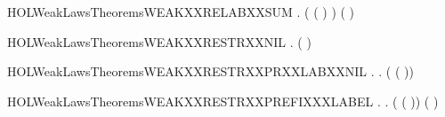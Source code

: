\newcommand{\HOLWeakLawsTheoremsWEAKXXRELABXXPREFIX}{\UseVerbatim{HOLWeakLawsTheoremsWEAKXXRELABXXPREFIX}}
\begin{SaveVerbatim}{HOLWeakLawsTheoremsWEAKXXRELABXXSUM}
\HOLTokenTurnstile{} \HOLSymConst{\HOLTokenForall{}}  .
        ( ( \HOLSymConst{+} ) ) (   \HOLSymConst{+}   )
\end{SaveVerbatim}
\newcommand{\HOLWeakLawsTheoremsWEAKXXRELABXXSUM}{\UseVerbatim{HOLWeakLawsTheoremsWEAKXXRELABXXSUM}}
\begin{SaveVerbatim}{HOLWeakLawsTheoremsWEAKXXRESTRXXNIL}
\HOLTokenTurnstile{} \HOLSymConst{\HOLTokenForall{}}.  (\HOLConst{\ensuremath{\nu}}  ) 
\end{SaveVerbatim}
\newcommand{\HOLWeakLawsTheoremsWEAKXXRESTRXXNIL}{\UseVerbatim{HOLWeakLawsTheoremsWEAKXXRESTRXXNIL}}
\begin{SaveVerbatim}{HOLWeakLawsTheoremsWEAKXXRESTRXXPRXXLABXXNIL}
\HOLTokenTurnstile{} \HOLSymConst{\HOLTokenForall{}} .
        \HOLConst{\HOLTokenIn{}}  \HOLSymConst{\HOLTokenDisj{}}   \HOLConst{\HOLTokenIn{}}  \HOLSymConst{\HOLTokenImp{}}
       \HOLSymConst{\HOLTokenForall{}}.  (\HOLConst{\ensuremath{\nu}}  ( )) 
\end{SaveVerbatim}
\newcommand{\HOLWeakLawsTheoremsWEAKXXRESTRXXPRXXLABXXNIL}{\UseVerbatim{HOLWeakLawsTheoremsWEAKXXRESTRXXPRXXLABXXNIL}}
\begin{SaveVerbatim}{HOLWeakLawsTheoremsWEAKXXRESTRXXPREFIXXXLABEL}
\HOLTokenTurnstile{} \HOLSymConst{\HOLTokenForall{}} .
        \HOLConst{\HOLTokenNotIn{}}  \HOLSymConst{\HOLTokenConj{}}   \HOLConst{\HOLTokenNotIn{}}  \HOLSymConst{\HOLTokenImp{}}
       \HOLSymConst{\HOLTokenForall{}}.  (\HOLConst{\ensuremath{\nu}}  ( )) ( \HOLConst{\ensuremath{\nu}}  )
\end{SaveVerbatim}
